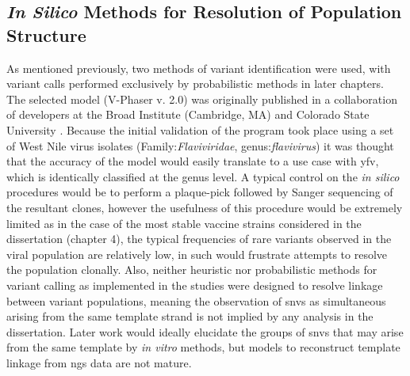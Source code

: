 \subsection{\emph{In Silico} Methods for Resolution of Population Structure}
As mentioned previously, two methods of variant identification were used, with variant calls performed exclusively by probabilistic methods in later chapters. The selected model (V-Phaser v. 2.0) was originally published in a collaboration of developers at the Broad Institute (Cambridge, MA) and Colorado State University \parencite{Yang:2013hk}. Because the initial validation of the program took place using a set of West Nile virus isolates (Family:\emph{Flaviviridae}, genus:\emph{flavivirus}) it was thought that the accuracy of the model would easily translate to a use case with \gls{yfv}, which is identically classified at the genus level. A typical control on the \emph{in silico} procedures would be to perform a plaque-pick followed by Sanger sequencing of the resultant clones, however the usefulness of this procedure would be extremely limited as in the case of the most stable vaccine strains considered in the dissertation (chapter 4), the typical frequencies of rare variants observed in the viral population are relatively low, in such would frustrate attempts to resolve the population clonally. Also, neither heuristic nor probabilistic methods for variant calling as implemented in the studies were designed to resolve linkage between variant populations, meaning the observation of \glspl{snv} as simultaneous arising from the same template strand is not implied by any analysis in the dissertation. Later work would ideally elucidate the groups of \glspl{snv} that may arise from the same template by \emph{in vitro} methods, but models to reconstruct template linkage from \gls{ngs} data are not mature.
